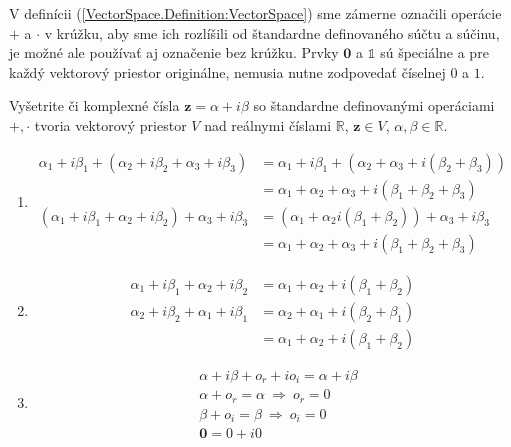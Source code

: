 \documentclass[a4paper, 10pt, ]{article}
\begin{document}
V definícii (\ref{VectorSpace.Definition:VectorSpace}) sme zámerne označili operácie $+$ a $\cdot$ v krúžku, aby sme ich rozlíšili od štandardne definovaného súčtu a súčinu, je možné ale používať aj označenie bez krúžku. Prvky $\bm{0}$ a $\mathbb{1}$ sú špeciálne a pre každý vektorový priestor originálne, nemusia nutne zodpovedať číselnej $0$ a $1$.

\begin{example}
    Vyšetrite či komplexné čísla $\bm{z} = \alpha + i \beta$ so štandardne definovanými operáciami $+, \cdot$ tvoria vektorový priestor $V$ nad reálnymi číslami $\mathbb{R}$, $\bm{z} \in V$, $\alpha, \beta \in \mathbb{R}$.

    \begin{enumerate}
        \item
        \begin{align*}
            \alpha_1 + i \beta_1 + (\alpha_2 + i \beta_2 + \alpha_3 + i \beta_3) &= 
            \alpha_1 + i \beta_1 + (\alpha_2 + \alpha_3 + i (\beta_2 + \beta_3)) \\ &= 
            \alpha_1 + \alpha_2 + \alpha_3 + i (\beta_1 + \beta_2 + \beta_3) \\ 
            (\alpha_1 + i \beta_1 + \alpha_2 + i \beta_2) + \alpha_3 + i \beta_3 &= 
            (\alpha_1 + \alpha_2 i (\beta_1 + \beta_2)) + \alpha_3 + i\beta_3 \\ &= 
            \alpha_1 + \alpha_2 + \alpha_3 + i (\beta_1 + \beta_2 + \beta_3) 
        \end{align*}
        
        \item
        \begin{align*}
            \alpha_1 + i \beta_1 + \alpha_2 + i \beta_2 &= 
            \alpha_1 + \alpha_2 + i (\beta_1 + \beta_2) \\ 
            \alpha_2 + i \beta_2 + \alpha_1 + i \beta_1&= 
            \alpha_2 + \alpha_1 + i (\beta_2 + \beta_1) \\ &= 
            \alpha_1 + \alpha_2 + i (\beta_1 + \beta_2) 
        \end{align*}

        \item
        \begin{align*}
            &\alpha + i \beta + o_r + i o_i = 
            \alpha + i \beta \\ 
            &\alpha + o_r = \alpha \ \Longrightarrow \ o_r = 0 \\
            &\beta + o_i = \beta \ \Longrightarrow \ o_i = 0 \\
            & \bm{0} = 0 + i0 
        \end{align*}


\end{enumerate}
\end{example}
\end{document}
